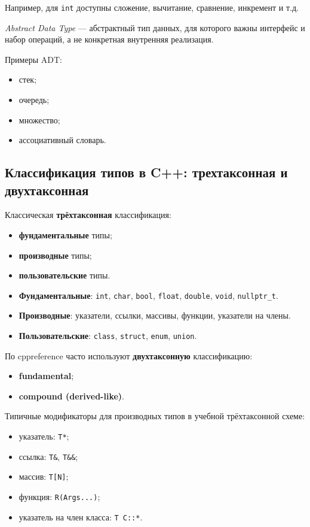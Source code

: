 Например, для \texttt{int} доступны сложение, вычитание, сравнение, инкремент и т.д.

\begin{definition}[ADT]
\textit{Abstract Data Type} — абстрактный тип данных, для которого важны интерфейс и набор операций, а не конкретная внутренняя реализация.
\end{definition}

Примеры ADT:
\begin{itemize}
    \item стек;
    \item очередь;
    \item множество;
    \item ассоциативный словарь.
\end{itemize}

\subsection{Классификация типов в C++: трехтаксонная и двухтаксонная}
Классическая \textbf{трёхтаксонная} классификация:
\begin{itemize}
    \item \textbf{фундаментальные} типы;
    \item \textbf{производные} типы;
    \item \textbf{пользовательские} типы.
\end{itemize}

\begin{itemize}
    \item \textbf{Фундаментальные}: \texttt{int}, \texttt{char}, \texttt{bool}, \texttt{float}, \texttt{double}, \texttt{void}, \texttt{nullptr\_t}.
    \item \textbf{Производные}: указатели, ссылки, массивы, функции, указатели на члены.
    \item \textbf{Пользовательские}: \texttt{class}, \texttt{struct}, \texttt{enum}, \texttt{union}.
\end{itemize}

По cppreference часто используют \textbf{двухтаксонную} классификацию:
\begin{itemize}
    \item \textbf{fundamental};
    \item \textbf{compound (derived-like)}.
\end{itemize}

Типичные модификаторы для производных типов в учебной трёхтаксонной схеме:
\begin{itemize}
    \item указатель: \texttt{T*};
    \item ссылка: \texttt{T\&}, \texttt{T\&\&};
    \item массив: \texttt{T[N]};
    \item функция: \texttt{R(Args...)};
    \item указатель на член класса: \texttt{T C::*}.
\end{itemize}

